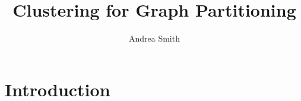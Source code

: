 \documentclass{article}
\title{Clustering for Graph Partitioning}
\author{Andrea Smith}
\begin{document}
\begin{titlingpage}
\maketitle
\end{titlingpage}

\section{Introduction}

\begin{comment}
\begin{figure}[!htb]
\begin{center}
	\texttt{[image: puppy.png]}
	\caption{T-Test for Relative Fitness with Parsimony Pressures 0.2 and 0.3}
	\label{tTestMLR}
\end{center}
\end{figure}
\end{comment}
\end{document}
